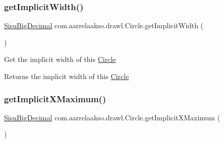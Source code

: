 \mbox{\label{classcom_1_1aarrelaakso_1_1drawl_1_1_circle_a062c441fca2adcc959e236d7352bea55}} 
\subsubsection{\texorpdfstring{get\+Implicit\+Width()}{getImplicitWidth()}}
{\footnotesize\ttfamily \hyperlink{classcom_1_1aarrelaakso_1_1drawl_1_1_sisu_big_decimal}{Sisu\+Big\+Decimal} com.\+aarrelaakso.\+drawl.\+Circle.\+get\+Implicit\+Width (\begin{DoxyParamCaption}{ }\end{DoxyParamCaption})\hspace{0.3cm}{\ttfamily [protected]}}

Get the implicit width of this \hyperlink{classcom_1_1aarrelaakso_1_1drawl_1_1_circle}{Circle}

\begin{DoxyReturn}{Returns}
the implicit width of this \hyperlink{classcom_1_1aarrelaakso_1_1drawl_1_1_circle}{Circle} 
\end{DoxyReturn}
\mbox{\label{classcom_1_1aarrelaakso_1_1drawl_1_1_circle_acb7e453b97a2800eaf52d209f9759bf6}} 
\subsubsection{\texorpdfstring{get\+Implicit\+X\+Maximum()}{getImplicitXMaximum()}}
{\footnotesize\ttfamily \hyperlink{classcom_1_1aarrelaakso_1_1drawl_1_1_sisu_big_decimal}{Sisu\+Big\+Decimal} com.\+aarrelaakso.\+drawl.\+Circle.\+get\+Implicit\+X\+Maximum (\begin{DoxyParamCaption}{ }\end{DoxyParamCaption})\hspace{0.3cm}{\ttfamily [protected]}}

